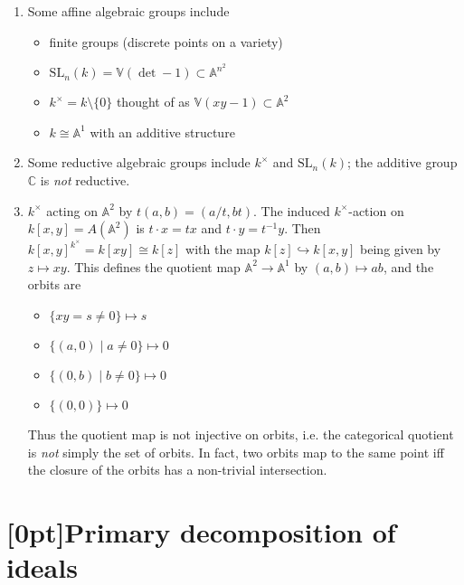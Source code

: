 \documentclass[10pt]{article}
\newcommand{\cc}{\mathbb{C}}
\newcommand{\van}{\mathbb{V}}
\newcommand{\aff}{\mathbb{A}}
\newcommand{\AG}{\textcolor{green}{AG}}
\begin{document}
            \begin{enumerate}
                \item Some affine algebraic groups include
                    \begin{itemize}
                        \item finite groups (discrete points on a variety)
                        \item $\mathrm{SL}_n(k)=\van(\det-1)\subset\aff^{n^2}$
                        \item $k^\times=k\setminus\{0\}$ thought of as $\van(xy-1)\subset\aff^2$
                        \item $k\cong\aff^1$ with an additive structure
                    \end{itemize}
                \item Some reductive algebraic groups include $k^\times$ and $\mathrm{SL}_n(k)$; the additive group $\cc$ is \emph{not} reductive.
                \item $k^\times$ acting on $\aff^2$ by $t(a,b)=(a/t,bt)$.
                    The induced $k^\times$-action on $k[x,y]=A(\aff^2)$ is $t\cdot x=tx$ and $t\cdot y=t^{-1}y$.
                    Then $k[x,y]^{k^\times}=k[xy]\cong k[z]$ with the map $k[z]\hookrightarrow k[x,y]$ being given by $z\mapsto xy$.
                    This defines the quotient map $\aff^2\to\aff^1$ by $(a,b)\mapsto ab$, and the orbits are
                    \begin{itemize}
                        \item $\{xy=s\neq0\}\mapsto s$
                        \item $\{(a,0)\mid a\neq0\}\mapsto0$
                        \item $\{(0,b)\mid b\neq0\}\mapsto0$
                        \item $\{(0,0)\}\mapsto0$
                    \end{itemize}
                    Thus the quotient map is not injective on orbits, i.e. the categorical quotient is \emph{not} simply the set of orbits.
                    In fact, two orbits map to the same point iff the closure of the orbits has a non-trivial intersection.
            \end{enumerate}

    \section{\protect\marginnote{\AG}[0pt]Primary decomposition of ideals}
\end{document}
